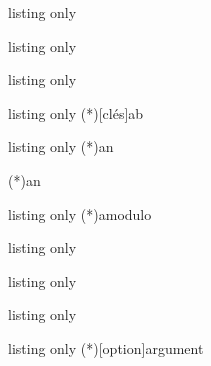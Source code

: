\begin{PresCodeTexPL}{listing only}
\pflprespgcd
\end{PresCodeTexPL}

\begin{PresCodeTexPL}{listing only}
\pflopeposee
\end{PresCodeTexPL}

\begin{PresCodeTexPL}{listing only}
\pflequadioph
\end{PresCodeTexPL}

\begin{PresCodeTexPL}{listing only}
\DivEucl(*)[clés]{a}{b}
\pfldiveucl

\pflpresdiveucl
\end{PresCodeTexPL}

\begin{PresCodeTexPL}{listing only}
\QuoMod(*){a}{n}
\pflquomod

\ResteMod(*){a}{n}
\pflrestemod
\end{PresCodeTexPL}

\begin{PresCodeTexPL}{listing only}
\InverseModulo(*){a}{modulo}
\pflinvmod
\end{PresCodeTexPL}

\begin{PresCodeTexPL}{listing only}
\pflchiffrcesar
\end{PresCodeTexPL}

\begin{PresCodeTexPL}{listing only}
\pflchiffraff
\end{PresCodeTexPL}

\begin{PresCodeTexPL}{listing only}
\pflchiffrhill
\end{PresCodeTexPL}

\begin{PresCodeTexPL}{listing only}
\ConversionFraction(*)[option]{argument}
\end{PresCodeTexPL}

